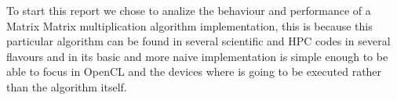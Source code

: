 \par{To start this report we chose to analize the behaviour and performance of a Matrix Matrix multiplication algorithm 
    implementation, this is because this particular algorithm can be found in several scientific and HPC codes in several flavours
    and in its basic and more naive implementation is simple enough to be able to focus in OpenCL and the devices where is going to be 
    executed rather than the algorithm itself.}

